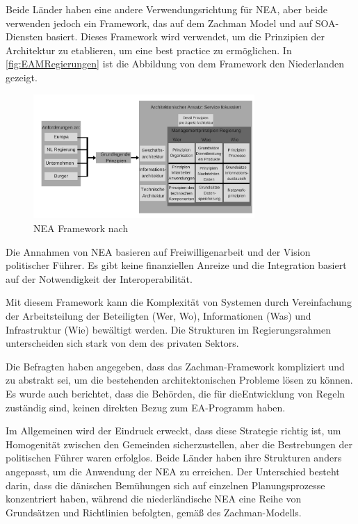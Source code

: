 \documentclass[
	doc,
	a4paper,
	helv
	]{apa6}
\begin{document}
Beide Länder haben eine andere Verwendungsrichtung für NEA, aber beide verwenden jedoch ein Framework, das auf dem Zachman Model und auf SOA-Diensten basiert. Dieses Framework wird verwendet, um die Prinzipien der Architektur zu etablieren, um eine best practice zu ermöglichen. In \autoref{fig:EAMRegierungen} ist die Abbildung von dem Framework den Niederlanden gezeigt.

\begin{figure}[!htbp]
\begin{center}
\includegraphics[width=0.75\textwidth]{Abbildungen/EAMRegierungen.png}
\caption{NEA Framework nach \textcite{Janssen2007}}
\label{fig:EAMRegierungen}
\end{center}
\end{figure}

\newpage
Die Annahmen von NEA basieren auf Freiwilligenarbeit und der Vision politischer Führer. Es gibt keine finanziellen Anreize und die Integration basiert auf der Notwendigkeit der Interoperabilität.

Mit diesem Framework kann die Komplexität von Systemen durch Vereinfachung der Arbeitsteilung der Beteiligten (Wer, Wo), Informationen (Was) und Infrastruktur (Wie) bewältigt werden. Die Strukturen im Regierungsrahmen unterscheiden sich stark von dem des privaten Sektors.

Die Befragten haben angegeben, dass das Zachman-Framework kompliziert und zu abstrakt sei, um die bestehenden architektonischen Probleme lösen zu können. Es wurde auch berichtet, dass die Behörden, die für dieEntwicklung von Regeln zuständig sind, keinen direkten Bezug zum EA-Programm haben.

Im Allgemeinen wird der Eindruck erweckt, dass diese Strategie richtig ist, um Homogenität zwischen den Gemeinden  sicherzustellen, aber die Bestrebungen der politischen Führer waren erfolglos.
Beide Länder haben ihre Strukturen anders angepasst, um die Anwendung der NEA zu erreichen. Der Unterschied besteht darin, dass die dänischen Bemühungen  sich auf einzelnen Planungsprozesse konzentriert haben, während die niederländische NEA eine Reihe von Grundsätzen und Richtlinien befolgten, gemäß des Zachman-Modells.
\end{document}
